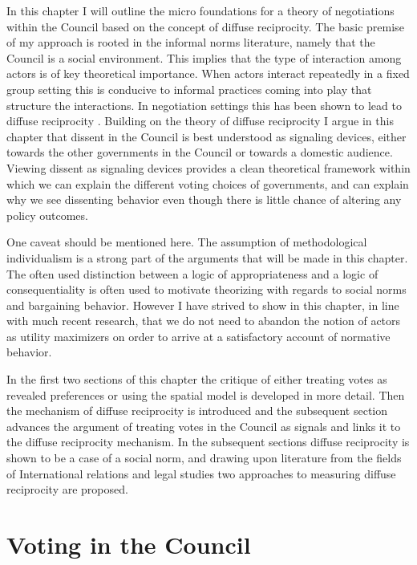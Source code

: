 In this chapter I will outline the micro foundations for a theory of negotiations within the Council based on the concept of diffuse reciprocity. The basic premise of my approach is rooted in the informal norms literature, namely that the Council is a social environment. This implies that the type of interaction among actors is of key theoretical importance\citet{Johnston2001}. When actors interact repeatedly in a fixed group setting this is conducive to informal practices coming into play  that structure the interactions. In negotiation settings this has been shown to lead to diffuse reciprocity \citet{Jonsson2000}. Building on the theory of diffuse reciprocity I argue in this chapter that dissent in the Council is best understood as signaling devices, either towards the other governments in the Council or towards a domestic audience. Viewing dissent as signaling devices provides a clean theoretical framework within which we can explain the different voting choices of governments, and can explain why we see dissenting behavior even though there is little chance of altering any policy outcomes. 

One caveat should be mentioned here. The assumption of methodological individualism is a strong part of the arguments that will be made in this chapter. The often used distinction between a logic of appropriateness and a logic of consequentiality \citep{MarchOlsen1998} is often used to motivate theorizing with regards to social norms and bargaining behavior. However I have strived to show in this chapter, in line with much recent research, that we do not need to abandon the notion of actors as utility maximizers on order to arrive at a satisfactory account of normative behavior. 

In the first two sections of this chapter the critique of either treating votes as revealed preferences or using the spatial model is developed in more detail. Then the mechanism of diffuse reciprocity is introduced and the subsequent section advances the argument of treating votes in the Council as signals and links it to the diffuse reciprocity mechanism. In the subsequent sections diffuse reciprocity is shown to be a case of a social norm, and drawing upon literature from the fields of International relations and legal studies two approaches to measuring diffuse reciprocity are proposed. 

\section{Voting in the Council }

